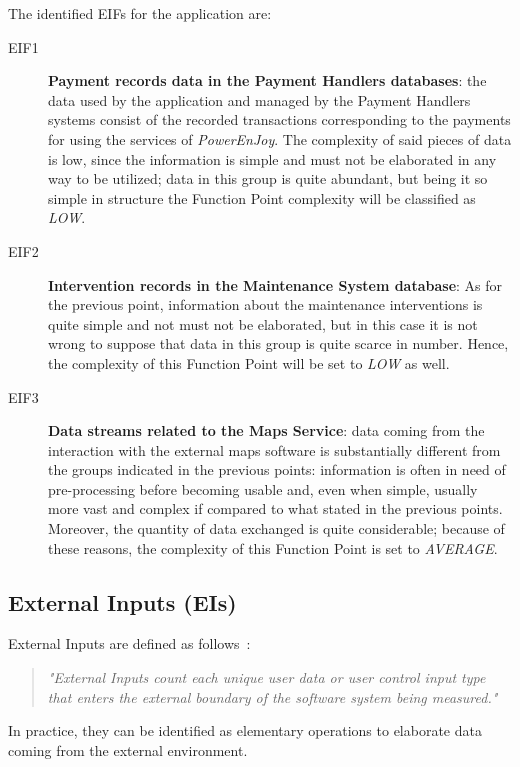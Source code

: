 The identified EIFs for the application are:
\begin{description}
\item[EIF1] \textbf{Payment records data in the Payment Handlers databases}: the data used by the application and managed by the Payment Handlers systems consist of the recorded transactions corresponding to the payments for using the services of \textit{PowerEnJoy}. The complexity of said pieces of data is low, since the information is simple and must not be elaborated in any way to be utilized; data in this group is quite abundant, but being it so simple in structure the Function Point complexity will be classified as \textit{LOW}.
\item[EIF2] \textbf{Intervention records in the Maintenance System database}: As for the previous point, information about the maintenance interventions is quite simple and not must not be elaborated, but in this case it is not wrong to suppose that data in this group is quite scarce in number. Hence, the complexity of this Function Point will be set to \textit{LOW} as well.
\item[EIF3] \textbf{Data streams related to the Maps Service}: data coming from the interaction with the external maps software is substantially different from the groups indicated in the previous points: information is often in need of pre-processing before becoming usable and, even when simple, usually more vast and complex if compared to what stated in the previous points. Moreover, the quantity of data exchanged is quite considerable; because of these reasons, the complexity of this Function Point is set to \textit{AVERAGE}.
\end{description}

\subsection{External Inputs (EIs)}
External Inputs are defined as follows~\cite{cocomo-manual}:
\begin{quotation}
\textit{"External Inputs count each unique user data or user control input type that enters the external boundary of the software system being measured."}
\end{quotation}
In practice, they can be identified as elementary operations to elaborate data coming from the external environment.

